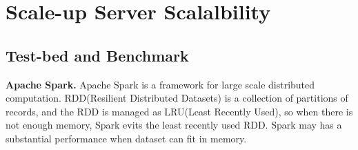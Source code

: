 
\section{Scale-up Server Scalalbility}




\ifkor
\else

\fi



\subsection{Test-bed and Benchmark}

\ifkor
\noindent
\textbf{Apache Spark. }
Apache Spark is a framework for large scale distributed computation.
RDD(Resilient Distributed Datasets) is a collection of partitions of records, 
and the RDD is managed as LRU(Least Recently Used), so when there is not enough
memory, Spark evits the least recently used RDD.
Spark may has a substantial performance when dataset can fit in memory.


\else
\fi

